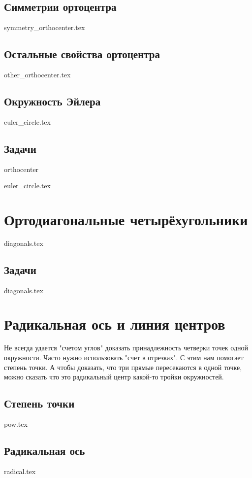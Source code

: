 \documentclass[twoside]{article}
\begin{document}
\subsection{Симметрии ортоцентра}
{symmetry_orthocenter.tex}

\subsection{Остальные свойства ортоцентра}
{other_orthocenter.tex}

\subsection{Окружность Эйлера}
{euler_circle.tex}

\subsection*{Задачи}
{orthocenter}


{euler_circle.tex}


\section{Ортодиагональные четырёхугольники}
{diagonals.tex}

\subsection*{Задачи}
{diagonals.tex}


\section{Радикальная ось и линия центров}
Не всегда удается "счетом углов" доказать принадлежность четверки точек одной окружности. Часто нужно использовать "счет в отрезках". С этим нам помогает степень точки. А чтобы доказать, что три прямые пересекаются в одной точке, можно сказать что это радикальный центр какой-то тройки окружностей.
\subsection{Степень точки}
{pow.tex}

\subsection{Радикальная ось}
{radical.tex}
\end{document}
